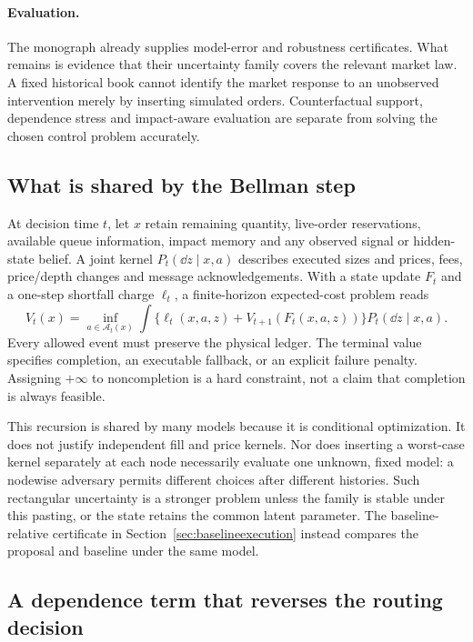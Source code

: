 \paragraph{Evaluation.}
The monograph already supplies model-error and robustness certificates. What
remains is evidence that their uncertainty family covers the relevant
market law. A fixed historical book cannot identify the market response
to an unobserved intervention merely by inserting simulated orders.
Counterfactual support, dependence stress and impact-aware evaluation are
separate from solving the chosen control problem accurately.

\subsection{What is shared by the Bellman step}

At decision time \(t\), let \(x\) retain remaining quantity, live-order
reservations, available queue information, impact memory and any observed
signal or hidden-state belief. A joint kernel
\(P_t(\dd z\mid x,a)\) describes executed sizes and prices, fees,
price/depth changes and message acknowledgements. With a state update
\(F_t\) and a one-step shortfall charge \(\ell_t\), a finite-horizon
expected-cost problem reads
\begin{equation}\label{eq:jointexecutionbellman}
 V_t(x)=\inf_{a\in\mathcal A_t(x)}
  \int\{\ell_t(x,a,z)+V_{t+1}(F_t(x,a,z))\}
                  P_t(\dd z\mid x,a).
\end{equation}
Every allowed event must preserve the physical ledger. The terminal value
specifies completion, an executable fallback, or an explicit failure
penalty. Assigning \(+\infty\) to noncompletion is a hard constraint, not a
claim that completion is always feasible.

This recursion is shared by many models because it is conditional
optimization. It does not justify independent fill and price kernels.
Nor does inserting a worst-case kernel separately at each node necessarily
evaluate one unknown, fixed model: a nodewise adversary permits different
choices after different histories. Such rectangular uncertainty is a
stronger problem unless the family is stable under this pasting, or the
state retains the common latent parameter. The baseline-relative
certificate in Section~\ref{sec:baselineexecution} instead compares the
proposal and baseline under the same model.

\subsection{A dependence term that reverses the routing decision}

